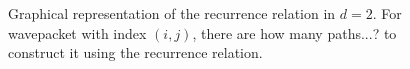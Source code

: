 \begin{figure}[h!]
\begin{tikzpicture}
  \end{tikzpicture}
  \caption{Graphical representation of the recurrence relation in $d=2$. For 
  wavepacket with index $(i,j)$, there are how many paths...? to construct it using 
  the recurrence relation.}
  \label{figure:lattice}
\end{figure}


